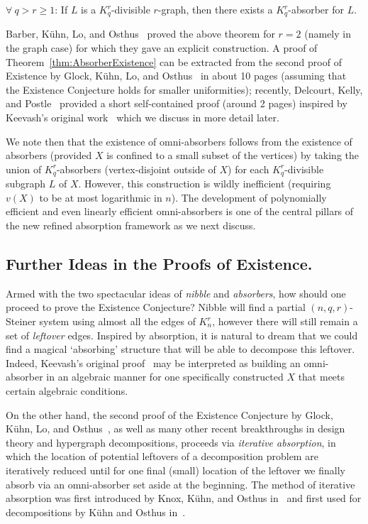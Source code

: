 \documentclass[twoside,leqno]{article}
\begin{document}
\begin{theorem}\label{thm:AbsorberExistence}  $\forall~q > r\ge 1$: If $L$ is a $K_q^r$-divisible $r$-graph, then there exists a $K_q^r$-absorber for $L$.
\end{theorem}

Barber, K\"uhn, Lo, and Osthus~\cite{BKLO16} proved the above theorem for $r=2$ (namely in the graph case) for which they gave an explicit construction. A proof of Theorem~\ref{thm:AbsorberExistence} can be extracted from the second proof of Existence by Glock, K\"uhn, Lo, and Osthus~\cite{GKLO16} in about 10 pages (assuming that the Existence Conjecture holds for smaller uniformities); recently, Delcourt, Kelly, and Postle~\cite{DKP24} provided a short self-contained proof (around 2 pages) inspired by Keevash's original work~\cite{K14} which we discuss in more detail later. 

We note then that the existence of omni-absorbers follows from the existence of absorbers (provided $X$ is confined to a small subset of the vertices) by taking the union of $K_q^r$-absorbers (vertex-disjoint outside of $X$) for each $K_q^r$-divisible subgraph $L$ of $X$. However, this construction is wildly inefficient (requiring $v(X)$ to be at most logarithmic in $n$). The development of polynomially efficient and even linearly efficient omni-absorbers is one of the central pillars of the new refined absorption framework as we next discuss.

\subsection{Further Ideas in the Proofs of Existence.} Armed with the two spectacular ideas of \emph{nibble} and \emph{absorbers}, how should one proceed to prove the Existence Conjecture? Nibble will find a partial $(n,q,r)$-Steiner system using almost all the edges of $K_n^r$, however there will still remain a set of \emph{leftover} edges. Inspired by absorption, it is natural to dream that we could find a magical `absorbing' structure that will be able to decompose this leftover. Indeed, Keevash's original proof~\cite{K14} may be interpreted as building an omni-absorber in an algebraic manner for one specifically constructed $X$ that meets certain algebraic conditions. 

On the other hand, the second proof of the Existence Conjecture by Glock, K\"{u}hn, Lo, and Osthus~\cite{GKLO16}, as well as many other recent breakthroughs in design theory and hypergraph decompositions, proceeds via \emph{iterative absorption}, in which the location of potential leftovers of a decomposition problem are iteratively reduced until for one final (small) location of the leftover we finally absorb via an omni-absorber set aside at the beginning. The method of iterative absorption was first introduced by Knox, K\"{u}hn, and Osthus in~\cite{KKO15} and first used for decompositions by K\"{u}hn and Osthus in~\cite{KO13}. 
\end{document}
